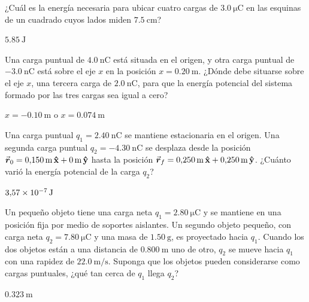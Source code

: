 \setcounter{figure}{0}
%
\begin{Exercise}
  ¿Cuál es la energía necesaria para ubicar cuatro cargas de $\SI{3.0}{\micro\coulomb}$ en las esquinas de un cuadrado cuyos lados miden $\SI{7.5}{\centi\metre}$?
\end{Exercise}
\begin{Answer}
  $\SI{5.85}{\joule}$
\end{Answer}
%
\begin{Exercise}
  Una carga puntual de $\SI{4.0}{\nano\coulomb}$ está situada en el origen, y otra carga puntual de $\SI{-3.0}{\nano\coulomb}$ está sobre el eje $x$ en la posición $x = \SI{0.20}{\metre}$. ¿Dónde debe situarse sobre el eje $x$, una tercera carga de $\SI{2.0}{\nano\coulomb}$, para que la energía potencial del sistema formado por las tres cargas sea igual a cero?
\end{Exercise}
\begin{Answer}
	\begin{minipage}[t]{.4\textwidth}
    $x = \SI{-0.10}{\metre}$ o $x = \SI{0.074}{\metre}$
  \end{minipage}
\end{Answer}
%
\begin{Exercise}
  Una carga puntual $q_1 = \SI{2.40}{\nano\coulomb}$ se mantiene estacionaria en el origen. Una segunda carga puntual $q_2 = \SI{-4.30}{\nano\coulomb}$ se desplaza desde la posición $\va*{r}_0 =\SI{0.150}{\metre}\,\vu{x} + \SI{0}{\metre}\,\vu{y}$ hasta la posición $\va*{r}_f =\SI{0.250}{\metre}\,\vu{x} + \SI{0.250}{\metre}\,\vu{y}$. ¿Cuánto varió la energía potencial de la carga $q_2$?
\end{Exercise}
\begin{Answer}
  $\SI{3.57E-7}{\joule}$
\end{Answer}
%
\begin{Exercise}
  Un pequeño objeto tiene una carga neta $q_1 = \SI{2.80}{\micro\coulomb}$ y se mantiene en una posición fija por medio de soportes aislantes. Un segundo objeto pequeño, con carga neta $q_2 = \SI{7.80}{\micro\coulomb}$ y una masa de $\SI{1.50}{\gram}$, es proyectado hacia $q_1$. Cuando los dos objetos están a una distancia de $\SI{0.800}{\metre}$ uno de otro, $q_2$ se mueve hacia $q_1$ con una rapidez de $\SI{22.0}{\metre/\second}$. Suponga que los objetos pueden considerarse como cargas puntuales, ¿qué tan cerca de $q_1$ llega $q_2$?
\end{Exercise}
\begin{Answer}
  $\SI{0.323}{\metre}$
\end{Answer}
